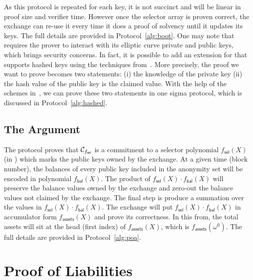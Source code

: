As this protocol is repeated for each key, it is not succinct and will be linear in proof size and verifier time. However once the selector array is proven correct, the exchange can re-use it every time it does a proof of solvency until it updates its keys. The full details are provided in Protocol~\ref{alg:boot}. One may note that \bootstrap requires the prover to interact with its elliptic curve private and public keys, which brings security concerns. In fact, it is possible to add an extension for \bootstrap that supports hashed keys using the techniques from~\cite{composite}. More precisely, the proof we want to prove becomes two statements: (i) the knowledge of the private key (ii) the hash value of the public key is the claimed value. With the help of the schemes in~\cite{composite}, we can prove these two statements in one sigma protocol, which is discussed in Protocol~\ref{alg:hashed}.




\subsection{The \poa Argument}


The \bootstrap protocol proves that $\mathcal{C}_{f_\mathsf{sel}}$ is a commitment to a selector polynomial $f_\mathsf{sel}(X)$ (in \bls) which marks the public keys owned by the exchange. At a given time (block number), the balances of every public key included in the anonymity set will be encoded in polynomial $f_\mathsf{bal}(X)$. The product of $f_\mathsf{sel}(X)\cdot{f_\mathsf{bal}}(X)$ will preserve the balance values owned by the exchange and zero-out the balance values not claimed by the exchange. The final step is produce a summation over the values in $f_\mathsf{sel}(X)\cdot{f_\mathsf{bal}}(X)$. The exchange will put $f_\mathsf{sel}(X)\cdot{f_\mathsf{bal}}(X)$ in accumulator form $f_\mathsf{assets}(X)$ and prove its correctness. In this from, the total assets will sit at the head (first index) of $f_\mathsf{assets}(X)$, which is $f_\mathsf{assets}(\omega^0)$. The full details are provided in Protocol~\ref{alg:poa}.


\section{Proof of Liabilities}

